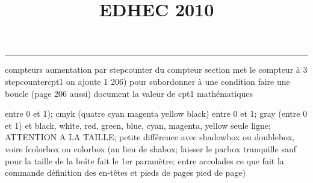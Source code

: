 \documentclass[11pt]{article}%
\title{\bf \vspace{-2cm} EDHEC 2010} %
\author{} %
\date{} %
\renewcommand{\headrulewidth}{0pt}%
\renewcommand{\footrulewidth}{0.4pt}%
\begin{document}
\maketitle %
\vspace{-1.4cm}\hrule %
\thispagestyle{fancy}

\vspace*{.2cm}



compteurs%
aumentation par stepcounter du compteur section%
met le compteur à 3%
stepcounter{cpt1} on ajoute 1%
206) pour subordonner à une condition %
faire une boucle (page 206 aussi) %
document la valeur de cpt1 
mathématiques\newcommand{\ch}{\operatorname{ch}} 
\newcommand{\sh}{\operatorname{sh}}
\renewcommand{\tanh}{\operatorname{th}}
\renewcommand{\sinh}{\operatorname{sh}}
\renewcommand{\cosh}{\operatorname{ch}}
\newcommand{\argsh}{\operatorname{argsh}}
\newcommand{\argch}{\operatorname{argch}}
\newcommand{\argth}{\operatorname{argth}}
\newcommand{\ker}{\operatorname{Ker}}
\renewcommand{\im}{\operatorname{Im}}
\newcommand{\rg}{\operatorname{rg}}
\newcommand{\Id}{\operatorname{Id}}
\newcommand{\id}{\operatorname{id}}
\renewcommand{\leq}{\leq}
\renewcommand{\geq}{\geq }

entre 0 et 1); cmyk (quatre cyan magenta yellow black) entre 0 et 1;
gray (entre 0 et 1) et black, white, red, green, blue, cyan, magenta,
yellow%
seule ligne; ATTENTION A LA TAILLE; petite différence avec shadowbox ou
doublebox, voire fcolorbox ou colorbox (au lieu de shabox; laisser le
parbox tranquille sauf pour la taille de la boîte
\newcommand{\Tbox}[1]{\begin{center} \shabox{\parbox{0.6
\linewidth}{#1}} \end{center}} %
fait le 1er paramètre; entre accolades ce que fait la commande
définition des en-têtes et pieds de pages\pagestyle{fancy}
\chead{}
\rfoot[ \ \thepage]{\thepage}
\cfoot{}
\lfoot{}
\thispagestyle{fancy} %
pied de page)\renewcommand{\footrulewidth}{0.4pt}
\renewcommand{\headrulewidth}{0.4pt}
\end{document}
